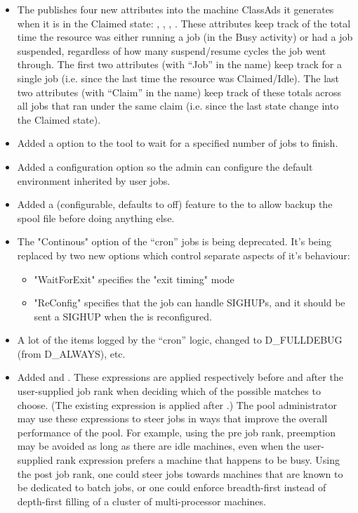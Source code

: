 \begin{itemize}
\item The  publishes four new attributes into the
  machine ClassAds it generates when it is in the Claimed state:
  , ,
  , .
  These attributes keep track of the total time the resource was
  either running a job (in the Busy activity) or had a job suspended,
  regardless of how many suspend/resume cycles the job went through.
  The first two attributes (with ``Job'' in the name) keep track for a
  single job (i.e. since the last time the resource was
  Claimed/Idle). 
  The last two attributes (with ``Claim'' in the name) keep track of
  these totals across all jobs that ran under the same claim
  (i.e. since the last state change into the Claimed state).

\item Added a  option to the  tool to wait for
   a specified number of jobs to finish.

\item Added a configuration option 
   so the admin can configure the default environment inherited by
   user jobs.

\item Added a (configurable, defaults to off) feature to the 
   to allow backup the spool file before doing anything else.

\item The "Continous" option of the  ``cron'' jobs is
being deprecated.   It's being replaced by two new options which
control separate aspects of it's behaviour:
\begin{itemize}
\item "WaitForExit" specifies the "exit timing" mode
\item "ReConfig" specifies that the job can handle SIGHUPs, and it should 
be sent a SIGHUP when the  is reconfigured.
\end{itemize}

\item A lot of the items logged by the  ``cron'' logic,
changed to D\_FULLDEBUG (from D\_ALWAYS), etc.

\item Added  and
.  These expressions are applied
respectively before and after the user-supplied job rank when deciding
which of the possible matches to choose.  (The existing expression
 is applied after
.)  The pool administrator may use
these expressions to steer jobs in ways that improve the overall
performance of the pool.  For example, using the pre job rank,
preemption may be avoided as long as there are idle machines, even
when the user-supplied rank expression prefers a machine that happens
to be busy.  Using the post job rank, one could steer jobs towards
machines that are known to be dedicated to batch jobs, or one could
enforce breadth-first instead of depth-first filling of a cluster of
multi-processor machines.


\end{itemize}
